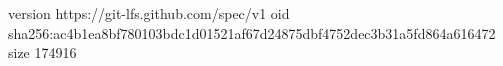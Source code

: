 version https://git-lfs.github.com/spec/v1
oid sha256:ac4b1ea8bf780103bdc1d01521af67d24875dbf4752dec3b31a5fd864a616472
size 174916
